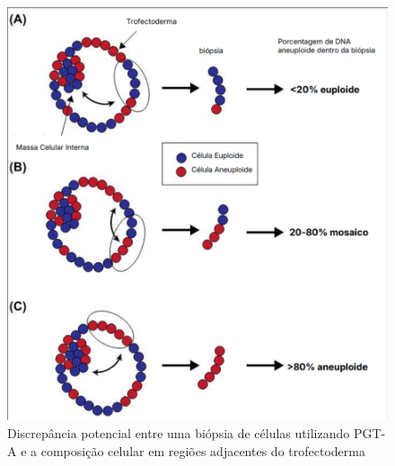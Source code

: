 \begin{figure}[h]
    \captionsetup{font=footnotesize, position=above}
    \caption{Discrepância potencial entre uma biópsia de células utilizando PGT-A e a composição celular em regiões adjacentes do trofectoderma}
    \label{fig:biopsiaPGT-A}
    \centering
    \includegraphics[scale=0.6]{figuras/biopsiaPGT-A.pdf}
    \vspace{0.3cm} 
    \begin{minipage}{\linewidth}
        \centering

\end{minipage}
\end{figure}
